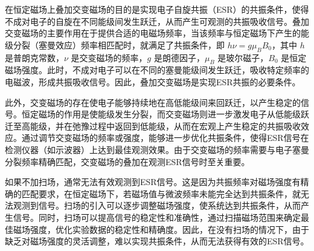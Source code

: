 \documentclass[dvipsnames, svgnames,a4paper,11pt]{article}
\begin{document}



在恒定磁场上叠加交变磁场的目的是实现电子自旋共振（ESR）的共振条件，使得不成对电子的自旋在不同能级间发生跃迁，从而产生可观测的共振吸收信号。叠加交变磁场的主要作用在于提供合适的电磁场频率，当该频率与恒定磁场下产生的能级分裂（塞曼效应）频率相匹配时，就满足了共振条件，即 \( h\nu = g\mu_B B_0 \)，其中 \( h \) 是普朗克常数，\( \nu \) 是交变磁场的频率，\( g \) 是朗德因子，\( \mu_B \) 是玻尔磁子，\( B_0 \) 是恒定磁场强度。此时，不成对电子可以在不同的塞曼能级间发生跃迁，吸收特定频率的电磁波，形成共振吸收信号。因此，叠加交变磁场是实现ESR共振的必要条件。

此外，交变磁场的存在使电子能够持续地在高低能级间来回跃迁，以产生稳定的信号。恒定磁场的作用是使能级发生分裂，而交变磁场则进一步激发电子从低能级跃迁至高能级，并在弛豫过程中返回到低能级，从而在宏观上产生稳定的共振吸收效应。通过调节交变磁场的频率或强度，能够进一步优化共振条件，使得ESR信号在检测仪器（如示波器）上达到最佳观测效果。由于交变磁场的频率需要与电子塞曼分裂频率精确匹配，交变磁场的叠加在观测ESR信号时至关重要。

如果不加扫场，通常无法有效观测到ESR信号。这是因为共振频率对磁场强度有精确的匹配要求，在恒定磁场下，若磁场值与微波频率未能完全达到共振条件，就无法观测到信号。扫场的引入可以逐步调整磁场强度，使系统达到共振条件，从而产生信号。同时，扫场可以提高信号的稳定性和准确性，通过扫描磁场范围来确定最佳磁场强度，优化实验数据的稳定性和精确度。因此，在没有扫场的情况下，由于缺乏对磁场强度的灵活调整，难以实现共振条件，从而无法获得有效的ESR信号。







\end{document}
